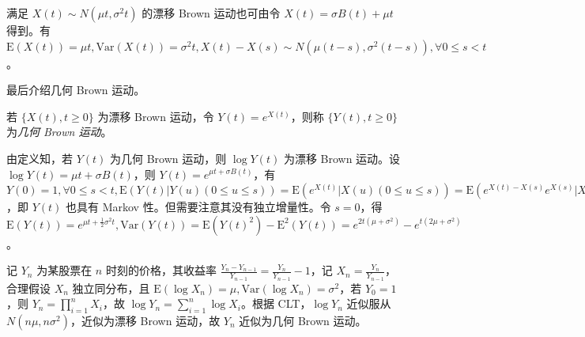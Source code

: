 \documentclass[../main.tex]{subfiles}
\begin{document}
满足 $X(t)\sim N(\mu t,\sigma^2t)$ 的漂移 Brown 运动也可由令 $X(t)=\sigma B(t)+\mu t$ 得到。有 $\mathrm E(X(t))=\mu t,\mathrm{Var}(X(t))=\sigma^2t,X(t)-X(s)\sim N(\mu(t-s),\sigma^2(t-s)),\forall0\leq s<t$。

最后介绍几何 Brown 运动。

\begin{definition}\label{def:8.4.2}
    若 $\{X(t),t\geq0\}$ 为漂移 Brown 运动，令 $Y(t)=e^{X(t)}$，则称 $\{Y(t),t\geq0\}$ 为\emph{几何 Brown 运动}。
\end{definition}

由定义知，若 $Y(t)$ 为几何 Brown 运动，则 $\log Y(t)$ 为漂移 Brown 运动。设 $\log Y(t)=\mu t+\sigma B(t)$，则 $Y(t)=e^{\mu t+\sigma B(t)}$，有 $Y(0)=1,\forall0\leq s<t,\mathrm E(Y(t)|Y(u)(0\leq u\leq s))=\mathrm E(e^{X(t)}|X(u)(0\leq u\leq s))=\mathrm E(e^{X(t)-X(s)}e^{X(s)}|X(u)(0\leq u\leq s))=e^{X(s)}\mathrm E(e^{X(t)-X(s)})=e^{X(s)}e^{\mu(t-s)+\frac12\sigma^2(t-s)}=Y(s)e^{\mu(t-s)+\frac12\sigma^2(t-s)}$，即 $Y(t)$ 也具有 Markov 性。但需要注意其没有独立增量性。令 $s=0$，得 $\mathrm E(Y(t))=e^{\mu t+\frac12\sigma^2t},\mathrm{Var}(Y(t))=\mathrm E(Y(t)^2)-\mathrm E^2(Y(t))=e^{2t(\mu+\sigma^2)}-e^{t(2\mu+\sigma^2)}$。

\begin{example}
    记 $Y_n$ 为某股票在 $n$ 时刻的价格，其收益率 $\frac{Y_n-Y_{n-1}}{Y_{n-1}}=\frac{Y_n}{Y_{n-1}}-1$，记 $X_n=\frac{Y_n}{Y_{n-1}}$，合理假设 $X_n$ 独立同分布，且 $\mathrm E(\log X_n)=\mu,\mathrm{Var}(\log X_n)=\sigma^2$，若 $Y_0=1$，则 $Y_n=\prod_{i=1}^nX_i$，故 $\log Y_n=\sum_{i=1}^n\log X_i$。根据 CLT，$\log Y_n$ 近似服从 $N(n\mu,n\sigma^2)$，近似为漂移 Brown 运动，故 $Y_n$ 近似为几何 Brown 运动。
\end{example}
\end{document}
